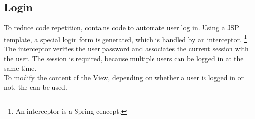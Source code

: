 \subsection*{Login}
To reduce code repetition, \salespoint{} contains code to automate user log in.
Using a JSP template, a special login form is generated, which is handled by an interceptor.
\footnote{An interceptor is a Spring concept.}
The interceptor verifies the user password and associates the current session with the user.
The session is required, because multiple users can be logged in at the same time.\\

To modify the content of the View, depending on whether a user is logged in or not, the  can be used.
